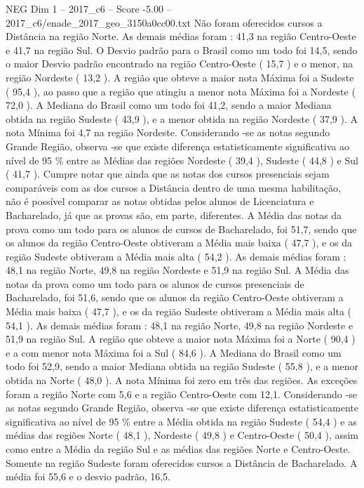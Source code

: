 \begin{textsample}{NEG Dim 1 – 2017\_c6 – Score -5.00 – 2017\_c6/enade\_2017\_geo\_3150a0cc00.txt}
Não foram oferecidos cursos a Distância na região Norte.
As demais médias foram : 41,3 na região Centro-Oeste e 41,7 na região Sul.
O Desvio padrão para o Brasil como um todo foi 14,5, sendo o maior Desvio padrão encontrado na região Centro-Oeste ( 15,7 ) e o menor, na região Nordeste ( 13,2 ).
A região que obteve a maior nota Máxima foi a Sudeste ( 95,4 ), ao passo que a região que atingiu a menor nota Máxima foi a Nordeste ( 72,0 ).
A Mediana do Brasil como um todo foi 41,2, sendo a maior Mediana obtida na região Sudeste ( 43,9 ), e a menor obtida na região Nordeste ( 37,9 ).
A nota Mínima foi 4,7 na região Nordeste.
Considerando -se as notas segundo Grande Região, observa -se que existe diferença estatisticamente significativa ao nível de 95 \% entre as Médias das regiões Nordeste ( 39,4 ), Sudeste ( 44,8 ) e Sul ( 41,7 ).
Cumpre notar que ainda que as notas dos cursos presenciais sejam comparáveis com as dos cursos a Distância dentro de uma mesma habilitação, não é possível comparar as notas obtidas pelos alunos de Licenciatura e Bacharelado, já que as provas são, em parte, diferentes.
A Média das notas da prova como um todo para os alunos de cursos de Bacharelado, foi 51,7, sendo que os alunos da região Centro-Oeste obtiveram a Média mais baixa ( 47,7 ), e os da região Sudeste obtiveram a Média mais alta ( 54,2 ).
As demais médias foram : 48,1 na região Norte, 49,8 na região Nordeste e 51,9 na região Sul.
A Média das notas da prova como um todo para os alunos de cursos presenciais de Bacharelado, foi 51,6, sendo que os alunos da região Centro-Oeste obtiveram a Média mais baixa ( 47,7 ), e os da região Sudeste obtiveram a Média mais alta ( 54,1 ).
As demais médias foram : 48,1 na região Norte, 49,8 na região Nordeste e 51,9 na região Sul.
A região que obteve a maior nota Máxima foi a Norte ( 90,4 ) e a com menor nota Máxima foi a Sul ( 84,6 ).
A Mediana do Brasil como um todo foi 52,9, sendo a maior Mediana obtida na região Sudeste ( 55,8 ), e a menor obtida na Norte ( 48,0 ).
A nota Mínima foi zero em três das regiões.
As exceções foram a região Norte com 5,6 e a região Centro-Oeste com 12,1.
Considerando -se as notas segundo Grande Região, observa -se que existe diferença estatisticamente significativa ao nível de 95 \% entre a Média obtida na região Sudeste ( 54,4 ) e as médias das regiões Norte ( 48,1 ), Nordeste ( 49,8 ) e Centro-Oeste ( 50,4 ), assim como entre a Média da região Sul e as médias das regiões Norte e Centro-Oeste.
Somente na região Sudeste foram oferecidos cursos a Distância de Bacharelado.
A média foi 55,6 e o desvio padrão, 16,5.

\end{textsample}
